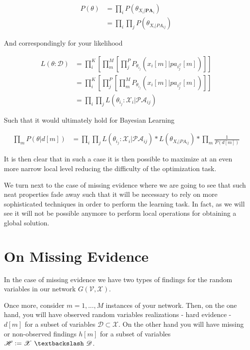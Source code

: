 \documentclass[11pt]{article}
\begin{document}
\begin{article}
\begin{align}
P(\theta) &= \prod_i P(\theta_{X_i |\textbf{PA}_i}) \nonumber \\ 
          &= \prod_i \prod_j P(\theta_{X_i |PA_{ij}}) \nonumber  
\end{align}

And correspondingly for your likelihood

\begin{align} 
L(\theta : \mathcal{D}) &= \prod_i^K [\prod_m^M [\prod_j^P  P_{\theta_i_j}(x_i[m] | pa_i_j^{\mathscr{G}}[m])]] \nonumber \\
                        &= \prod_i^K [\prod_j^P [\prod_m^M  P_{\theta_i_j}(x_i[m] | pa_i_j^{\mathscr{G}}[m])]] \nonumber \\
                        &= \prod_i \prod_j L(\theta_i_j : \mathcal{X}_i | \mathcal{PA}_{ij})  \nonumber
\end{align}

Such that it would ultimately hold for Bayesian Learning

\begin{align}
\prod_m P(\theta | d[m]) &=  \prod_i \prod_j  L(\theta_i_j : \mathcal{X}_i | \mathcal{PA}_{ij}) * L(\theta_{X_i | PA_{ij}}) * \prod_m \frac{1}{P(d[m])} 
\end{align}

It is then clear that in such a case it is then possible to
maximize at an even more narrow local level reducing the difficulty
of the optimization task.

We turn next to the case of missing evidence where we are going to
see that such neat properties fade away such that it will be
necessary to rely on more sophisticated techniques in order to
perform the learning task. In fact, as we will see it will not be
possible anymore to perform local operations for obtaining a global
solution.

\newpage


\section{On Missing Evidence}
\label{missing-learning}
In the case of missing evidence we have two types of findings for
the random variables in our network \(G(\mathscr{V}, \mathscr{X})\).

Once more, consider \(m = 1, ..., M\) instances of your network. Then,
on the one hand, you will have observed random variables
realizations - hard evidence - \(d[m]\) for a subset of variables
\(\mathscr{D} \subset \mathscr{X}\). On the other hand you will have
missing or non-observed findings \(h[m]\) for a subset of variables
\(\mathscr{H} \vcentcolon= \mathscr{X} \ \textbackslash \ \mathscr{D}\).


\end{article}
\end{document}
